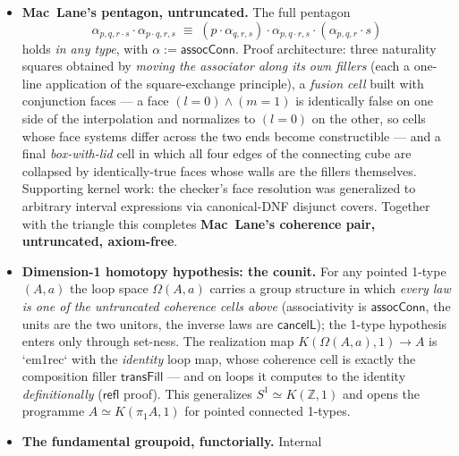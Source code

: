 \documentclass[11pt]{article}
\newcommand{\Z}{\mathbb{Z}}
\newcommand{\op}[1]{\ensuremath{\mathsf{#1}}}
\begin{document}
\begin{itemize}[leftmargin=1.5em]
  kernel improvement (canonical atomic face literals in system
  normalization: $\neg k{=}1 \mapsto k{=}0$, conjunctive splitting)
  makes the fillers of $\op{assocConn}\,p\,\op{refl}\,q$
  \emph{convertible} with the two unitors --- the associator at a middle
  $\op{refl}$ \emph{is} the diagonal of the unitor square.  Mac~Lane's
  \textbf{triangle} then holds untruncated, in any type, by a three-step
  argument (a diagonal-vs-edges lemma by the moving-middle method, plus
  right cancellation).
\item \textbf{Mac~Lane's pentagon, untruncated.}  The full pentagon
  \[ \alpha_{p,q,r\cdot s} \cdot \alpha_{p\cdot q,r,s} \;\equiv\;
     (p\cdot\alpha_{q,r,s}) \cdot \alpha_{p,q\cdot r,s} \cdot
     (\alpha_{p,q,r}\cdot s) \]
  holds \emph{in any type}, with $\alpha := \op{assocConn}$.  Proof
  architecture: three naturality squares obtained by \emph{moving the
  associator along its own fillers} (each a one-line application of the
  square-exchange principle), a \emph{fusion cell} built with
  conjunction faces --- a face $(l{=}0)\wedge(m{=}1)$ is identically
  false on one side of the interpolation and normalizes to $(l{=}0)$ on
  the other, so cells whose face systems differ across the two ends
  become constructible --- and a final \emph{box-with-lid} cell in which
  all four edges of the connecting cube are collapsed by identically-true
  faces whose walls are the fillers themselves.  Supporting kernel work:
  the checker's face resolution was generalized to arbitrary interval
  expressions via canonical-DNF disjunct covers.  Together with the
  triangle this completes \textbf{Mac~Lane's coherence pair, untruncated,
  axiom-free}.
\item \textbf{Dimension-1 homotopy hypothesis: the counit.}  For any
  pointed 1-type $(A,a)$ the loop space $\Omega(A,a)$ carries a group
  structure in which \emph{every law is one of the untruncated coherence
  cells above} (associativity is $\op{assocConn}$, the units are the two
  unitors, the inverse laws are $\op{cancelL}$); the 1-type hypothesis
  enters only through set-ness.  The realization map
  $K(\Omega(A,a),1) \to A$ is `em1rec` with the \emph{identity} loop
  map, whose coherence cell is exactly the composition filler
  $\op{transFill}$ --- and on loops it computes to the identity
  \emph{definitionally} ($\op{refl}$ proof).  This generalizes
  $S^1 \simeq K(\Z,1)$ and opens the programme
  $A \simeq K(\pi_1 A,1)$ for pointed connected 1-types.
\item \textbf{The fundamental groupoid, functorially.}  Internal

\end{itemize}
\end{document}

